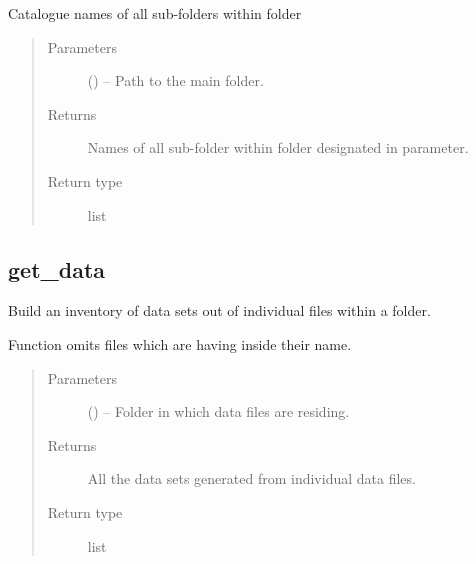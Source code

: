 \documentclass[letterpaper,10pt,english]{sphinxmanual}
\begin{document}
\begin{fulllineitems}
\label{\detokenize{api/ucf.get_all_sub_folders_within_folder:ucf.get_all_sub_folders_within_folder}}
Catalogue names of all sub-folders within folder
\begin{quote}\begin{description}
\item[{Parameters}] \leavevmode
{} () -- Path to the main folder.

\item[{Returns}] \leavevmode
Names of all sub-folder within folder designated in  parameter.

\item[{Return type}] \leavevmode
list

\end{description}\end{quote}

\end{fulllineitems}



\subsection{get\_data}
\label{\detokenize{api/ucf.get_data:get-data}}\label{\detokenize{api/ucf.get_data::doc}}

\begin{fulllineitems}
\label{\detokenize{api/ucf.get_data:ucf.get_data}}
Build an inventory of data sets out of individual files within a
folder.

Function omits files which are having  inside their name.
\begin{quote}\begin{description}
\item[{Parameters}] \leavevmode
{} () -- Folder in which data files are residing.

\item[{Returns}] \leavevmode
All the data sets generated from individual data
files.

\item[{Return type}] \leavevmode
list

\end{description}\end{quote}

\end{fulllineitems}
\end{document}
